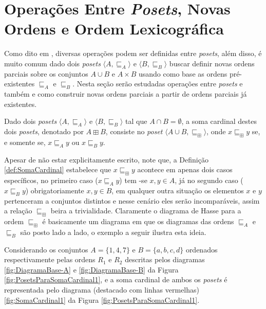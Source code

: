 \section{Operações Entre \textit{Posets}, Novas Ordens e Ordem Lexicográfica}\label{sec:OperacoesPoset}

Como dito em \cite{morgado1962poset}, diversas operações podem ser definidas entre \textit{posets}, além disso, é muito comum dado dois \textit{posets} $\langle A, \sqsubseteq_A \rangle$ e $\langle B, \sqsubseteq_B \rangle$ buscar definir novas ordens parciais sobre os conjuntos $A \cup B$ e $A \times B$ usando como base as ordens pré-existentes $\sqsubseteq_A$ e $\sqsubseteq_B$. Nesta seção serão estudadas operações entre \textit{posets} e também e como construir novas ordens parciais a partir de ordens parciais já existentes.

\begin{definicao}\label{def:SomaCardinal}
	Dado dois \textit{posets} $\langle A, \sqsubseteq_A \rangle$ e $\langle B, \sqsubseteq_B \rangle$ tal que $A \cap B = \emptyset$, a soma cardinal destes dois \textit{posets}, denotado por $A \boxplus B$, consiste no \textit{poset} $\langle A \cup B, \sqsubseteq_\boxplus \rangle$, onde $x \sqsubseteq_\boxplus y$ se, e somente se, $x \sqsubseteq_A y$ ou $x \sqsubseteq_B y$.
\end{definicao}

Apesar de não estar explicitamente escrito, note que, a Definição  \ref{def:SomaCardinal} estabelece que $x \sqsubseteq_\boxplus y$ acontece em apenas dois casos específicos, no primeiro caso ($x \sqsubseteq_A y$) tem -se $x, y \in A$, já no segundo caso ($x \sqsubseteq_B y$) obrigatoriamente $x, y \in B$, em qualquer outra situação os elementos $x$ e $y$ pertenceram a conjuntos distintos e nesse cenário eles serão incomparáveis, assim a relação $\sqsubseteq_\boxplus$ beira a trivialidade. Claramente o diagrama de Hasse para a ordem $\sqsubseteq_\boxplus$ é basicamente um diagrama em que os diagramas das ordens $\sqsubseteq_A$ e $\sqsubseteq_B$ são posto lado a lado, o exemplo a seguir ilustra esta ideia.

\begin{exemplo}
  Considerando os conjuntos $A = \{1, 4, 7\}$ e $B = \{a, b, c, d\}$ ordenados respectivamente pelas ordens $R_1$ e $R_2$ descritas pelos diagramas \ref{fig:DiagramaBase-A} e \ref{fig:DiagramaBase-B} da Figura \ref{fig:PosetsParaSomaCardinal1}, e a soma cardinal de ambos os \textit{posets} é representada pelo diagrama (destacado com linhas vermelhas) \ref{fig:SomaCardinal1} da Figura \ref{fig:PosetsParaSomaCardinal1}.
\end{exemplo}

